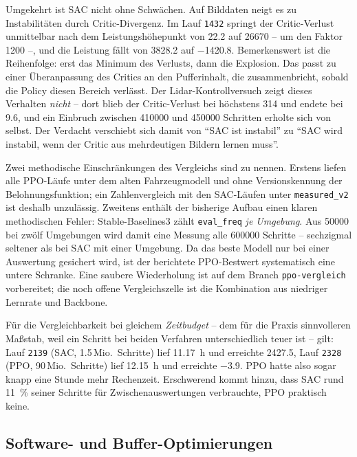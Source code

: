 Umgekehrt ist \ac{SAC} nicht ohne Schwächen. Auf Bilddaten neigt es zu Instabilitäten durch Critic-Divergenz. Im Lauf \texttt{1432} springt der Critic-Verlust unmittelbar nach dem Leistungshöhepunkt von \num{22.2} auf \num{26670} -- um den Faktor \num{1200} --, und die Leistung fällt von \num{3828.2} auf \num{-1420.8}. Bemerkenswert ist die Reihenfolge: erst das Minimum des Verlusts, dann die Explosion. Das passt zu einer Überanpassung des Critics an den Pufferinhalt, die zusammenbricht, sobald die Policy diesen Bereich verlässt. Der Lidar-Kontrollversuch zeigt dieses Verhalten \emph{nicht} -- dort blieb der Critic-Verlust bei höchstens \num{314} und endete bei \num{9.6}, und ein Einbruch zwischen \num{410000} und \num{450000} Schritten erholte sich von selbst. Der Verdacht verschiebt sich damit von \enquote{\ac{SAC} ist instabil} zu \enquote{\ac{SAC} wird instabil, wenn der Critic aus mehrdeutigen Bildern lernen muss}.

Zwei methodische Einschränkungen des Vergleichs sind zu nennen. Erstens liefen alle \ac{PPO}-Läufe unter dem alten Fahrzeugmodell und ohne Versionskennung der Belohnungsfunktion; ein Zahlenvergleich mit den \ac{SAC}-Läufen unter \texttt{measured\_v2} ist deshalb unzulässig. Zweitens enthält der bisherige Aufbau einen klaren methodischen Fehler: Stable-Baselines3 zählt \texttt{eval\_freq} \emph{je Umgebung}. Aus \num{50000} bei zwölf Umgebungen wird damit eine Messung alle \num{600000} Schritte -- sechzigmal seltener als bei \ac{SAC} mit einer Umgebung. Da das beste Modell nur bei einer Auswertung gesichert wird, ist der berichtete \ac{PPO}-Bestwert systematisch eine untere Schranke. Eine saubere Wiederholung ist auf dem Branch \texttt{ppo-vergleich} vorbereitet; die noch offene Vergleichszelle ist die Kombination aus niedriger Lernrate und Backbone.

Für die Vergleichbarkeit bei gleichem \emph{Zeitbudget} -- dem für die Praxis sinnvolleren Maßstab, weil ein Schritt bei beiden Verfahren unterschiedlich teuer ist -- gilt: Lauf \texttt{2139} (\ac{SAC}, \num{1.5}\,Mio.\ Schritte) lief \SI{11.17}{\hour} und erreichte \num{2427.5}, Lauf \texttt{2328} (\ac{PPO}, \num{90}\,Mio.\ Schritte) lief \SI{12.15}{\hour} und erreichte \num{-3.9}. \ac{PPO} hatte also sogar knapp eine Stunde mehr Rechenzeit. Erschwerend kommt hinzu, dass \ac{SAC} rund \SI{11}{\percent} seiner Schritte für Zwischenauswertungen verbrauchte, \ac{PPO} praktisch keine.

\subsection{Software- und Buffer-Optimierungen}
\label{subsec:buffer}


